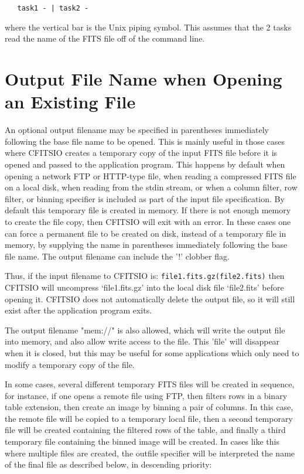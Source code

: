 \documentclass[11pt]{book}
\begin{document}
\begin{verbatim}
   task1 - | task2 -
\end{verbatim}
where the vertical bar is the Unix piping symbol.  This assumes that the 2
tasks read the name of the FITS file off of the command line.


\section{Output File Name when Opening an Existing File}

An optional output filename may be specified in parentheses immediately
following the base file name to be opened.  This is mainly useful in
those cases where CFITSIO creates a temporary copy of the input FITS
file before it is opened and passed to the application program.  This
happens by default when opening a network FTP or HTTP-type file, when
reading a compressed FITS file on a local disk, when reading from the
stdin stream, or when a column filter, row filter, or binning specifier
is included as part of the input file specification.  By default this
temporary file is created in memory.  If there is not enough memory to
create the file copy, then CFITSIO will exit with an error.   In these
cases one can force a permanent file to be created on disk, instead of
a temporary file in memory, by supplying the name in parentheses
immediately following the base file name.  The output filename can
include the '!' clobber flag.

Thus, if the input filename to CFITSIO is:
\verb+file1.fits.gz(file2.fits)+
then CFITSIO will uncompress `file1.fits.gz' into the local disk file
`file2.fits' before opening it.  CFITSIO does not automatically delete
the output file, so it will still exist after the application program
exits.

The output filename "mem://" is also allowed, which will write the
output file into memory, and also allow write access to the file.  This
'file' will disappear when it is closed, but this may be useful for
some applications which only need to modify a temporary copy of the file.

In some cases, several different temporary FITS files will be created
in sequence, for instance, if one opens a remote file using FTP, then
filters rows in a binary table extension, then create an image by
binning a pair of columns.  In this case, the remote file will be
copied to a temporary local file, then a second temporary file will be
created containing the filtered rows of the table, and finally a third
temporary file containing the binned image will be created.  In cases
like this where multiple files are created, the outfile specifier will
be interpreted the name of the final file as described below, in descending
priority:
\end{document}
